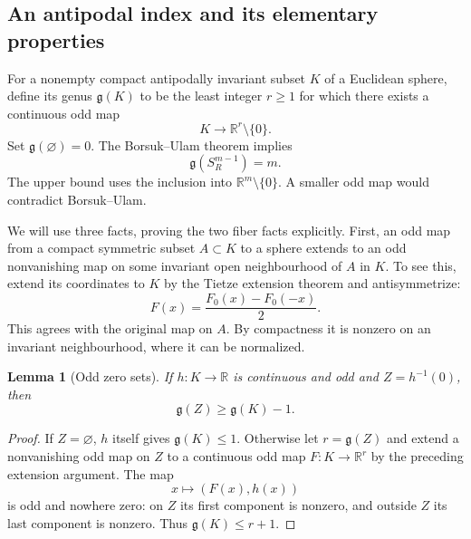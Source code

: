 \documentclass[11pt,a4paper]{article}
\newtheorem{lemma}[theorem]{Lemma}
\theoremstyle{remark}
\newcommand{\R}{\mathbb R}
\newcommand{\gen}{\mathfrak g}
\begin{document}
\subsection{An antipodal index and its elementary properties}

For a nonempty compact antipodally invariant subset $K$ of a Euclidean sphere, define its genus $\gen(K)$ to be the least integer $r\ge1$ for which there exists a continuous odd map
\[
 K\longrightarrow\R^r\setminus\{0\}.
\]
Set $\gen(\varnothing)=0$. The Borsuk--Ulam theorem implies
\begin{equation}\label{eq:gensphere}
 \gen(S_R^{m-1})=m.
\end{equation}
The upper bound uses the inclusion into $\R^m\setminus\{0\}$. A smaller odd map would contradict Borsuk--Ulam.

We will use three facts, proving the two fiber facts explicitly. First, an odd map from a compact symmetric subset $A\subset K$ to a sphere extends to an odd nonvanishing map on some invariant open neighbourhood of $A$ in $K$. To see this, extend its coordinates to $K$ by the Tietze extension theorem and antisymmetrize:
\[
 F(x)=\frac{F_0(x)-F_0(-x)}2.
\]
This agrees with the original map on $A$. By compactness it is nonzero on an invariant neighbourhood, where it can be normalized.

\begin{lemma}[Odd zero sets]\label{lem:oddzero}
If $h:K\to\R$ is continuous and odd and $Z=h^{-1}(0)$, then
\[
 \gen(Z)\ge\gen(K)-1.
\]
\end{lemma}
\begin{proof}
If $Z=\varnothing$, $h$ itself gives $\gen(K)\le1$. Otherwise let $r=\gen(Z)$ and extend a nonvanishing odd map on $Z$ to a continuous odd map $F:K\to\R^r$ by the preceding extension argument. The map
\[
 x\longmapsto(F(x),h(x))
\]
is odd and nowhere zero: on $Z$ its first component is nonzero, and outside $Z$ its last component is nonzero. Thus $\gen(K)\le r+1$.
\end{proof}
\end{document}
